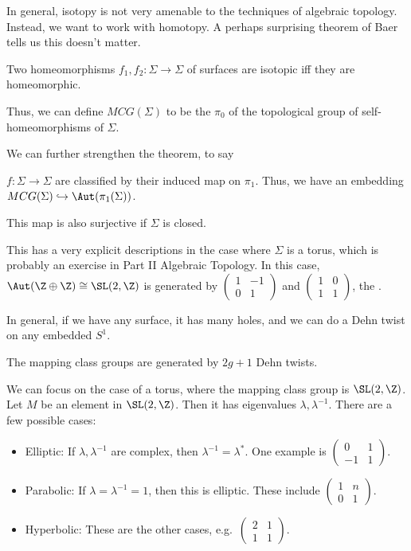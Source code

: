 \documentclass[a4paper]{article}
\begin{document}
In general, isotopy is not very amenable to the techniques of algebraic topology. Instead, we want to work with homotopy. A perhaps surprising theorem of Baer tells us this doesn't matter.
\begin{thm}
  Two homeomorphisms $f_1, f_2: \Sigma \to \Sigma$ of surfaces are isotopic iff they are homeomorphic.
\end{thm}
Thus, we can define $MCG(\Sigma)$ to be the $\pi_0$ of the topological group of self-homeomorphisms of $\Sigma$.

We can further strengthen the theorem, to say
\begin{thm}
  $f: \Sigma \to \Sigma$ are classified by their induced map on $\pi_1$. Thus, we have an embedding $MCG(\Sigma) \hookrightarrow \Aut(\pi_1(\Sigma))$. %
\end{thm}

\begin{thm}[Dehn] %
  This map is also surjective if $\Sigma$ is closed.
\end{thm}

This has a very explicit descriptions in the case where $\Sigma$ is a torus, which is probably an exercise in Part II Algebraic Topology. In this case, $\Aut(\Z \oplus \Z) \cong \SL(2, \Z)$ is generated by $\begin{pmatrix}1 & -1\\ 0 & 1\end{pmatrix}$ and $\begin{pmatrix}1 & 0\\1 & 1\end{pmatrix}$, the . %


In general, if we have any surface, it has many holes, and we can do a Dehn twist on any embedded $S^1$.
\begin{thm}
  The mapping class groups are generated by $2g + 1$ Dehn twists. %
\end{thm}

We can focus on the case of a torus, where the mapping class group is $\SL(2, \Z)$. Let $M$ be an element in $\SL(2, \Z)$. Then it has eigenvalues $\lambda, \lambda^{-1}$. There are a few possible cases:
\begin{itemize}
  \item Elliptic: If $\lambda, \lambda^{-1}$ are complex, then $\lambda^{-1} = \lambda^*$. One example is $\begin{pmatrix}0 & 1\\ -1 & 1\end{pmatrix}$.
  \item Parabolic: If $\lambda = \lambda^{-1} = 1$, then this is elliptic. These include $\begin{pmatrix}1 & n\\0 & 1\end{pmatrix}$.
  \item Hyperbolic: These are the other cases, e.g.\ $\begin{pmatrix}2 & 1\\ 1 & 1\end{pmatrix}$.
\end{itemize}
\end{document}

